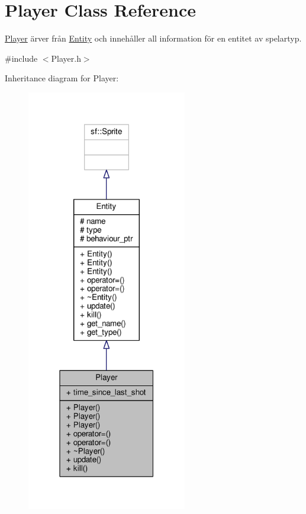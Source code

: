 \hypertarget{classPlayer}{\section{Player Class Reference}
\label{classPlayer}
}


\hyperlink{classPlayer}{Player} ärver från \hyperlink{classEntity}{Entity} och innehåller all information för en entitet av spelartyp.  




{\ttfamily \#include $<$Player.\+h$>$}



Inheritance diagram for Player\+:\nopagebreak
\begin{figure}[H]
\begin{center}
\leavevmode
\includegraphics[width=198pt]{classPlayer__inherit__graph}
\end{center}
\end{figure}


